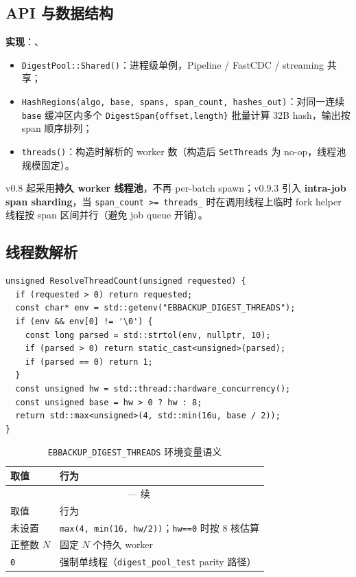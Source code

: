 \subsection{API 与数据结构}

\textbf{实现}：、

\begin{structbox}
\begin{itemize}[nosep]
  \item \texttt{DigestPool::Shared()}：进程级单例，Pipeline / FastCDC / streaming 共享；
  \item \texttt{HashRegions(algo, base, spans, span\_count, hashes\_out)}：对同一连续 \texttt{base} 缓冲区内多个 \texttt{DigestSpan\{offset,length\}} 批量计算 32B hash，输出按 span 顺序排列；
  \item \texttt{threads()}：构造时解析的 worker 数（构造后 \texttt{SetThreads} 为 no-op，线程池规模固定）。
\end{itemize}
\end{structbox}

v0.8 起采用\textbf{持久 worker 线程池}，不再 per-batch spawn；v0.9.3 引入 \textbf{intra-job span sharding}，当 \texttt{span\_count >= threads\_} 时在调用线程上临时 fork helper 线程按 span 区间并行（避免 job queue 开销）。

\subsection{线程数解析}

\begin{lstlisting}[caption={ResolveThreadCount（\filepath{digest\_pool.cc}）},label={lst:digest-threads}]
unsigned ResolveThreadCount(unsigned requested) {
  if (requested > 0) return requested;
  const char* env = std::getenv("EBBACKUP_DIGEST_THREADS");
  if (env && env[0] != '\0') {
    const long parsed = std::strtol(env, nullptr, 10);
    if (parsed > 0) return static_cast<unsigned>(parsed);
    if (parsed == 0) return 1;
  }
  const unsigned hw = std::thread::hardware_concurrency();
  const unsigned base = hw > 0 ? hw : 8;
  return std::max<unsigned>(4, std::min(16u, base / 2));
}
\end{lstlisting}

\begin{longtable}{@{}p{3.2cm}p{10cm}@{}}
\caption{\texttt{EBBACKUP\_DIGEST\_THREADS} 环境变量语义} \\
\toprule
取值 & 行为 \\
\midrule
\endfirsthead
\multicolumn{2}{c}{\tablename\ \thetable{} — 续} \\
\toprule
取值 & 行为 \\
\midrule
\endhead
未设置 & \texttt{max(4, min(16, hw/2))}；\texttt{hw==0} 时按 8 核估算 \\
正整数 $N$ & 固定 $N$ 个持久 worker \\
\texttt{0} & 强制单线程（\texttt{digest\_pool\_test} parity 路径） \\
\bottomrule
\end{longtable}

